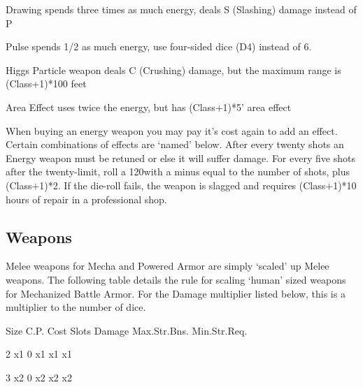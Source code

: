 \documentclass[twoside]{book}
\begin{document}
                
              
                 Drawing   
                  spends three times as much energy, deals S
                 (Slashing) damage instead of P 
                
              
                 Pulse   
                  spends 1/2 as much energy, use four-sided dice
                 (D4) instead of 6. 
                
              
                 Higgs Particle   
                  weapon deals C (Crushing) damage, but the maximum
                 range is (Class+1)*100 feet 
                
              
                 Area Effect   
                  uses twice the energy, but has (Class+1)*5'
                 area effect 
                
              When buying an energy weapon you may pay it's
               cost again to add an effect. Certain combinations of
               effects are `named' below.   After every twenty shots an Energy weapon must be
               retuned or else it will suffer damage. For every five
               shots after the twenty-limit, roll a 120with a minus
               equal to the number of shots, plus (Class+1)*2. If the
               die-roll fails, the weapon is slagged and requires
               (Class+1)*10 hours of repair in a professional shop.
               
\subsection{Weapons}
      Melee weapons for Mecha and Powered Armor are
               simply `scaled' up Melee weapons. The
               following table details the rule for scaling
               `human' sized weapons for Mechanized Battle
               Armor. For the Damage multiplier listed below, this is a
               multiplier to the number of dice.   
                
                  
                   Size 
                   C.P. Cost 
                   Slots 
                   Damage 
                   Max.Str.Bns. 
                   Min.Str.Req.   
                  
                  
                   2   
                   x1   
                   0   
                   x1   
                   x1   
                   x1   
                  
                  
                   3   
                   x2   
                   0   
                   x2   
                   x2   
                   x2   
                  
\end{document}
